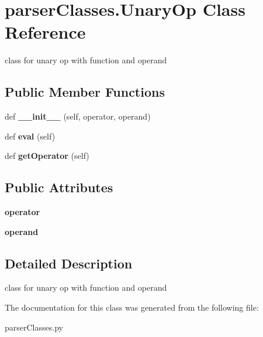 \hypertarget{classparser_classes_1_1_unary_op}{}\section{parser\+Classes.\+Unary\+Op Class Reference}
\label{classparser_classes_1_1_unary_op}


class for unary op with function and operand  


\subsection*{Public Member Functions}
\begin{DoxyCompactItemize}
\item 
def {\bfseries \+\_\+\+\_\+init\+\_\+\+\_\+} (self, operator, operand)\hypertarget{classparser_classes_1_1_unary_op_acd865fc282d065da966ee8ae6fd1221c}{}\label{classparser_classes_1_1_unary_op_acd865fc282d065da966ee8ae6fd1221c}

\item 
def {\bfseries eval} (self)\hypertarget{classparser_classes_1_1_unary_op_a3bcb0143d84e533f554616cf279910c1}{}\label{classparser_classes_1_1_unary_op_a3bcb0143d84e533f554616cf279910c1}

\item 
def {\bfseries get\+Operator} (self)\hypertarget{classparser_classes_1_1_unary_op_afa168433abdb12ff7376e1bfe4f6d347}{}\label{classparser_classes_1_1_unary_op_afa168433abdb12ff7376e1bfe4f6d347}

\end{DoxyCompactItemize}
\subsection*{Public Attributes}
\begin{DoxyCompactItemize}
\item 
{\bfseries operator}\hypertarget{classparser_classes_1_1_unary_op_a5207cf805eeb0fb6dc3386378216600d}{}\label{classparser_classes_1_1_unary_op_a5207cf805eeb0fb6dc3386378216600d}

\item 
{\bfseries operand}\hypertarget{classparser_classes_1_1_unary_op_a45cebabb240f349eb45b24331bb6323c}{}\label{classparser_classes_1_1_unary_op_a45cebabb240f349eb45b24331bb6323c}

\end{DoxyCompactItemize}


\subsection{Detailed Description}
class for unary op with function and operand 

The documentation for this class was generated from the following file\+:\begin{DoxyCompactItemize}
\item 
parser\+Classes.\+py\end{DoxyCompactItemize}
